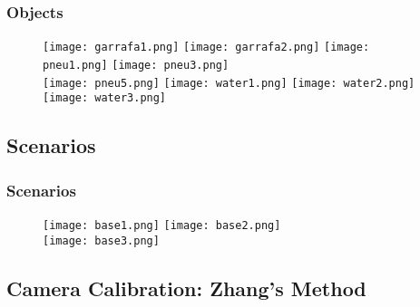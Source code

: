\documentclass{beamer}
\begin{document}
		\begin{frame}\frametitle{Objects}
			\begin{figure}[htb]
				\centering
				\texttt{[image: garrafa1.png]}
				\texttt{[image: garrafa2.png]}
				\texttt{[image: pneu1.png]}
				\texttt{[image: pneu3.png]}\\
				\texttt{[image: pneu5.png]}
				\texttt{[image: water1.png]}
				\texttt{[image: water2.png]}
				\texttt{[image: water3.png]}
				\label{fig:objetos1}
			\end{figure}


		\end{frame}


	\subsection{Scenarios}

		\begin{frame}\frametitle{Scenarios}
			\begin{figure}[htb!]
				\centering
				\texttt{[image: base1.png]}
				\texttt{[image: base2.png]}\\
				\texttt{[image: base3.png]}
				\label{fig:scenarios1}
			\end{figure}

		\end{frame}


\subsection{Camera Calibration: Zhang's Method}

\end{document}
